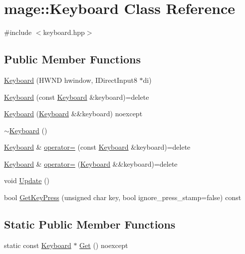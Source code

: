 \hypertarget{classmage_1_1_keyboard}{}\section{mage\+:\+:Keyboard Class Reference}
\label{classmage_1_1_keyboard}


{\ttfamily \#include $<$keyboard.\+hpp$>$}

\subsection*{Public Member Functions}
\begin{DoxyCompactItemize}
\item 
\hyperlink{classmage_1_1_keyboard_ac89c8f4132508901ff2ca57c68709928}{Keyboard} (H\+W\+ND hwindow, I\+Direct\+Input8 $\ast$di)
\item 
\hyperlink{classmage_1_1_keyboard_a39d07f8a5e37648ca9eba30aa55146bf}{Keyboard} (const \hyperlink{classmage_1_1_keyboard}{Keyboard} \&keyboard)=delete
\item 
\hyperlink{classmage_1_1_keyboard_a011a8cf9a3a3f50800879f5bdfdead3f}{Keyboard} (\hyperlink{classmage_1_1_keyboard}{Keyboard} \&\&keyboard) noexcept
\item 
\hyperlink{classmage_1_1_keyboard_a80a84ec68749fac71690fb45287d446a}{$\sim$\+Keyboard} ()
\item 
\hyperlink{classmage_1_1_keyboard}{Keyboard} \& \hyperlink{classmage_1_1_keyboard_ae3ba98190c8c14ea894c676888825f35}{operator=} (const \hyperlink{classmage_1_1_keyboard}{Keyboard} \&keyboard)=delete
\item 
\hyperlink{classmage_1_1_keyboard}{Keyboard} \& \hyperlink{classmage_1_1_keyboard_a4f381bc90cc6828b4d0313999b544e6e}{operator=} (\hyperlink{classmage_1_1_keyboard}{Keyboard} \&\&keyboard)=delete
\item 
void \hyperlink{classmage_1_1_keyboard_abb5fd91a304f8bbf8b15ab1a277dafaf}{Update} ()
\item 
bool \hyperlink{classmage_1_1_keyboard_a94d35ad5ad27e3fc9496f3ab1fa28e4d}{Get\+Key\+Press} (unsigned char key, bool ignore\+\_\+press\+\_\+stamp=false) const
\end{DoxyCompactItemize}
\subsection*{Static Public Member Functions}
\begin{DoxyCompactItemize}
\item 
static const \hyperlink{classmage_1_1_keyboard}{Keyboard} $\ast$ \hyperlink{classmage_1_1_keyboard_a696032d3a0d9bcf1a677a35e1e3d9aa8}{Get} () noexcept
\end{DoxyCompactItemize}
